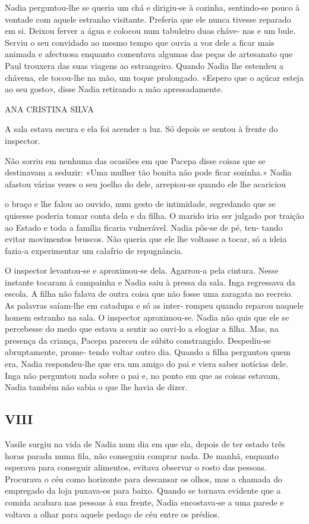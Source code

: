 Nadia perguntou‑lhe se queria um chá e dirigiu‑se à cozinha, sentindo‑se
pouco à vontade com aquele estranho visitante. Preferia que ele nunca
tivesse reparado em si. Deixou ferver a água e colocou num tabuleiro
duas cháve‑ nas e um bule. Serviu o seu convidado ao mesmo tempo que
ouvia a voz dele a ficar mais animada e afectuosa enquanto comentava
algumas das peças de artesanato que Paul trouxera das suas viagens ao
estrangeiro. Quando Nadia lhe estendeu a chávena, ele tocou‑lhe na mão,
um toque prolongado. «Espero que o açúcar esteja ao seu gosto», disse
Nadia retirando a mão apressadamente.

ANA CRISTINA SILVA

A sala estava escura e ela foi acender a luz. Só depois se sentou à
frente do inspector.

Não sorriu em nenhuma das ocasiões em que Pacepa disse coisas que se
destinavam a seduzir: «Uma mulher tão bonita não pode ficar sozinha.»
Nadia afastou várias vezes o seu joelho do dele, arrepiou‑se quando ele
lhe acariciou

o braço e lhe falou ao ouvido, num gesto de intimidade, segredando que
se quisesse poderia tomar conta dela e da filha. O marido iria ser
julgado por traição ao Estado e toda a família ficaria vulnerável. Nadia
pôs‑se de pé, ten‑ tando evitar movimentos bruscos. Não queria que ele
lhe voltasse a tocar, só a ideia fazia‑a experimentar um calafrio de
repugnância.

O inspector levantou‑se e aproximou‑se dela. Agarrou‑a pela cintura.
Nesse instante tocaram à campainha e Nadia saiu à pressa da sala. Inga
regressava da escola. A filha não falava de outra coisa que não fosse
uma zaragata no recreio. As palavras saíam‑lhe em catadupa e só as
inter‑ rompeu quando reparou naquele homem estranho na sala. O inspector
aproximou‑se. Nadia não quis que ele se percebesse do medo que estava a
sentir ao ouvi‑lo a elogiar a filha. Mas, na presença da criança, Pacepa
pareceu de súbito constrangido. Despediu‑se abruptamente, prome‑ tendo
voltar outro dia. Quando a filha perguntou quem era, Nadia respondeu‑lhe
que era um amigo do pai e viera saber notícias dele. Inga não perguntou
nada sobre o pai e, no ponto em que as coisas estavam, Nadia também não
sabia o que lhe havia de dizer.


\subsection{VIII}

Vasile surgiu na vida de Nadia num dia em que ela, depois de ter estado
três horas parada numa fila, não conseguiu comprar nada. De manhã,
enquanto esperava para conseguir alimentos, evitava observar o rosto das
pessoas. Procurava o céu como horizonte para descansar os olhos, mas a
chamada do empregado da loja puxava‑os para baixo. Quando se tornava
evidente que a comida acabara nas pessoas à sua frente, Nadia
encostava‑se a uma parede e voltava a olhar para aquele pedaço de céu
entre os prédios.

